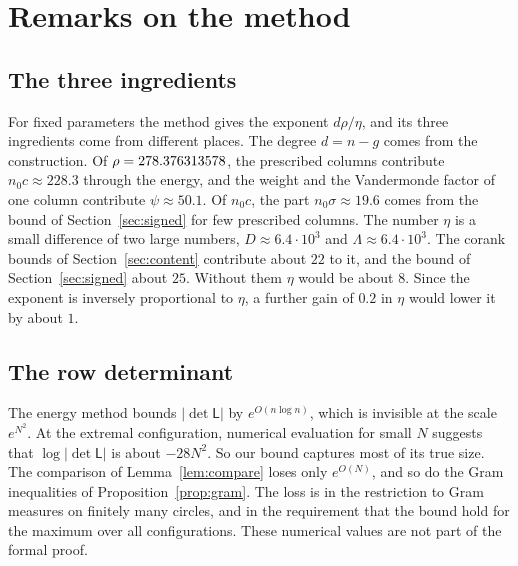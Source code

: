 \section{Remarks on the method}\label{sec:remarks}

\subsection{The three ingredients}
For fixed parameters the method gives the exponent $d\rho/\eta$, and its three ingredients come from
different places. The degree $d=n-g$ comes from the construction. Of $\rho=278.376313578$, the prescribed columns
contribute $n_0c\approx228.3$ through the energy, and the weight and the Vandermonde factor of one column
contribute $\psi\approx50.1$. Of $n_0c$, the part $n_0\sigma\approx19.6$ comes from the bound of
Section~\ref{sec:signed} for few prescribed columns. The number $\eta$ is a small difference of two large numbers, $D\approx6.4\cdot10^3$ and
$\Lambda\approx6.4\cdot10^3$. The corank bounds of Section~\ref{sec:content} contribute about $22$ to it, and the
bound of Section~\ref{sec:signed} about $25$. Without them $\eta$ would be about $8$. Since the exponent
is inversely proportional to $\eta$, a further gain of $0.2$ in $\eta$ would lower it by about $1$.

\subsection{The row determinant}
\begin{remark}\label{rem:L}
The energy method bounds $|\det\mathsf L|$ by $e^{O(n\log n)}$, which is invisible at the scale $e^{N^2}$.
At the extremal configuration, numerical evaluation for small $N$ suggests that $\log|\det\mathsf L|$ is about
$-28N^2$. So our bound captures most of its true size. The comparison of Lemma~\ref{lem:compare} loses only
$e^{O(N)}$, and so do the Gram inequalities of Proposition~\ref{prop:gram}. The loss is in the restriction to
Gram measures on finitely many circles, and in the requirement that the bound hold for the maximum over
all configurations. These numerical values are not part of the formal proof.
\end{remark}

